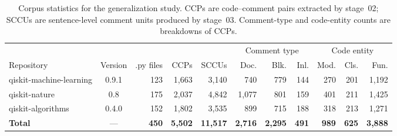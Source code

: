 \begin{table}[t]
  \centering
  \caption{Corpus statistics for the generalization study. CCPs are code--comment
  pairs extracted by stage~02; SCCUs are sentence-level comment units produced by
  stage~03. Comment-type and code-entity counts are breakdowns of CCPs.}
  \label{tab:generalization}
  \setlength{\tabcolsep}{4pt}
  \begin{tabular}{l c rrr rrr rrr}
    \toprule
    & & & & & \multicolumn{3}{c}{Comment type} & \multicolumn{3}{c}{Code entity} \\
    \cmidrule(lr){6-8} \cmidrule(lr){9-11}
    Repository & Version & .py files & CCPs & SCCUs & Doc. & Blk. & Inl. & Mod. & Cls. & Fun. \\
    \midrule
    qiskit-machine-learning & 0.9.1 & 123 & 1{,}663 & 3{,}140 & 740 & 779 & 144 & 270 & 201 & 1{,}192 \\
    qiskit-nature           & 0.8   & 175 & 2{,}037 & 4{,}842 & 1{,}077 & 801 & 159 & 401 & 211 & 1{,}425 \\
    qiskit-algorithms       & 0.4.0 & 152 & 1{,}802 & 3{,}535 & 899 & 715 & 188 & 318 & 213 & 1{,}271 \\
    \midrule
    \textbf{Total} & --- & \textbf{450} & \textbf{5{,}502} & \textbf{11{,}517} & \textbf{2{,}716} & \textbf{2{,}295} & \textbf{491} & \textbf{989} & \textbf{625} & \textbf{3{,}888} \\
    \bottomrule
  \end{tabular}
\end{table}
